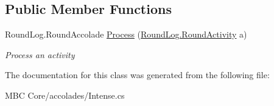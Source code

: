 \subsection*{Public Member Functions}
\begin{DoxyCompactItemize}
\item 
\hypertarget{class_m_b_c_1_1_core_1_1mbc_1_1accolades_1_1_intense_ad0177a4a8e91e17b2a08804eff068f0b}{Round\-Log.\-Round\-Accolade \hyperlink{class_m_b_c_1_1_core_1_1mbc_1_1accolades_1_1_intense_ad0177a4a8e91e17b2a08804eff068f0b}{Process} (\hyperlink{class_m_b_c_1_1_core_1_1_round_log_1_1_round_activity}{Round\-Log.\-Round\-Activity} a)}\label{class_m_b_c_1_1_core_1_1mbc_1_1accolades_1_1_intense_ad0177a4a8e91e17b2a08804eff068f0b}

\begin{DoxyCompactList}\small\item\em Process an activity\end{DoxyCompactList}\end{DoxyCompactItemize}


The documentation for this class was generated from the following file\-:\begin{DoxyCompactItemize}
\item 
M\-B\-C Core/accolades/Intense.\-cs\end{DoxyCompactItemize}
